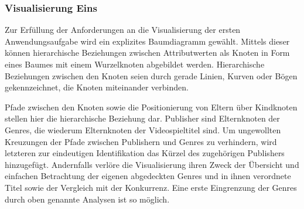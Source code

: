 \documentclass[usegeometry=true]{scrartcl}
\begin{document}

\subsubsection{Visualisierung Eins}
Zur Erfüllung der Anforderungen an die Visualisierung der ersten Anwendungsaufgabe wird ein explizites Baumdiagramm gewählt.
Mittels dieser können hierarchische Beziehungen zwischen Attributwerten als Knoten in Form eines Baumes mit einem Wurzelknoten abgebildet werden. 
Hierarchische Beziehungen zwischen den Knoten seien durch gerade Linien, Kurven oder Bögen gekennzeichnet, die Knoten miteinander verbinden.\cite[1]{Schulz.2011} 

Pfade zwischen den Knoten sowie die Positionierung von Eltern über Kindknoten stellen hier die hierarchische Beziehung dar. 
Publisher sind Elternknoten der Genres, die wiederum Elternknoten der Videospieltitel sind.
Um ungewollten Kreuzungen der Pfade zwischen Publishern und Genres zu verhindern, wird letzteren zur eindeutigen Identifikation das Kürzel des zugehörigen Publishers hinzugefügt.
Andernfalls verlöre die Visualisierung ihren Zweck der Übersicht und einfachen Betrachtung der eigenen abgedeckten Genres und in ihnen verordnete Titel sowie der Vergleich mit der Konkurrenz.
Eine erste Eingrenzung der Genres durch oben genannte Analysen ist so möglich.
\end{document}
